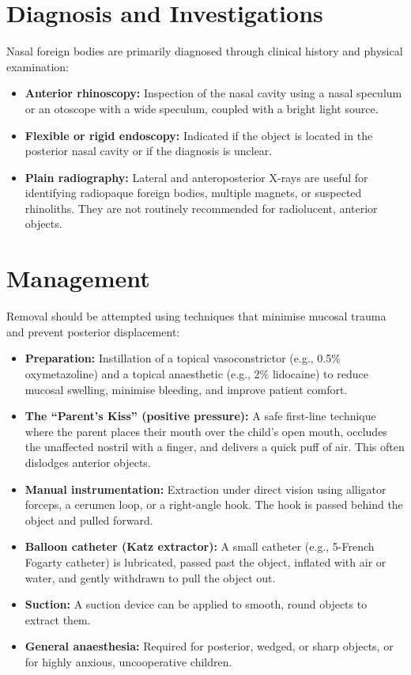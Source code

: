 \section*{Diagnosis and Investigations}
Nasal foreign bodies are primarily diagnosed through clinical history and physical examination:
\begin{itemize}
    \item \textbf{Anterior rhinoscopy:} Inspection of the nasal cavity using a nasal speculum or an otoscope with a wide speculum, coupled with a bright light source.
    \item \textbf{Flexible or rigid endoscopy:} Indicated if the object is located in the posterior nasal cavity or if the diagnosis is unclear.
    \item \textbf{Plain radiography:} Lateral and anteroposterior X-rays are useful for identifying radiopaque foreign bodies, multiple magnets, or suspected rhinoliths. They are not routinely recommended for radiolucent, anterior objects.
\end{itemize}

\section*{Management}
Removal should be attempted using techniques that minimise mucosal trauma and prevent posterior displacement:
\begin{itemize}
    \item \textbf{Preparation:} Instillation of a topical vasoconstrictor (e.g., 0.5\% oxymetazoline) and a topical anaesthetic (e.g., 2\% lidocaine) to reduce mucosal swelling, minimise bleeding, and improve patient comfort.
    \item \textbf{The ``Parent's Kiss'' (positive pressure):} A safe first-line technique where the parent places their mouth over the child's open mouth, occludes the unaffected nostril with a finger, and delivers a quick puff of air. This often dislodges anterior objects.
    \item \textbf{Manual instrumentation:} Extraction under direct vision using alligator forceps, a cerumen loop, or a right-angle hook. The hook is passed behind the object and pulled forward.
    \item \textbf{Balloon catheter (Katz extractor):} A small catheter (e.g., 5-French Fogarty catheter) is lubricated, passed past the object, inflated with air or water, and gently withdrawn to pull the object out.
    \item \textbf{Suction:} A suction device can be applied to smooth, round objects to extract them.
    \item \textbf{General anaesthesia:} Required for posterior, wedged, or sharp objects, or for highly anxious, uncooperative children.
\end{itemize}

